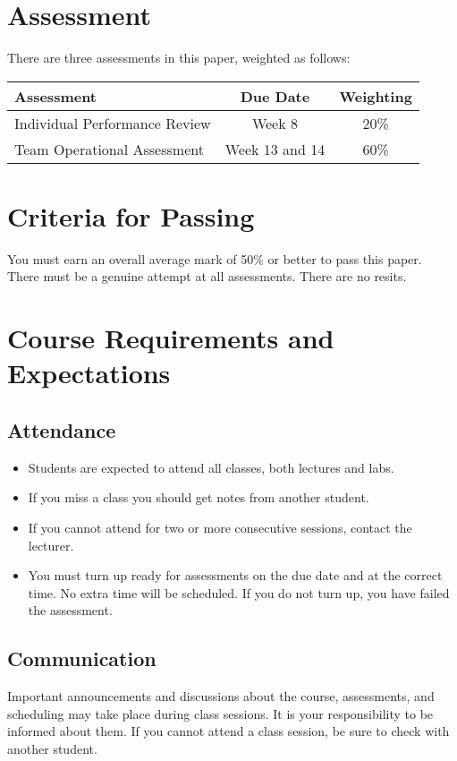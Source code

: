 \documentclass{article}
\begin{document}
\section*{Assessment}
There are three assessments in this paper, weighted as follows:


\begin{tabular}{|l|c|c|}
\hline
Assessment & Due Date & Weighting \\ \hline
Individual Performance Review & Week 8 & 20\% \\ \hline
Team Operational Assessment & Week 13 and 14 & 60\% \\ \hline
\end{tabular}


\section*{Criteria for Passing}
You must earn an overall average mark of 50\% or better to pass this paper. There must be a genuine attempt at all assessments. There are no resits.

\section*{Course Requirements and Expectations}
\subsection*{Attendance}
\begin{itemize}
 \item Students are expected to attend all classes, both lectures and labs.
 \item If you miss a class you should get notes from another student.
 \item If you cannot attend for two or more consecutive sessions, contact the lecturer.
 \item You must turn up ready for assessments on the due date and at the correct time. No 
       extra time will be scheduled. If you do not turn up, you have failed the assessment.
\end{itemize}

\subsection*{Communication}
Important announcements and discussions about the course, assessments, and scheduling may take place during class sessions.  It is your responsibility to be informed about them.  If you cannot attend a class session, be sure to check with another student.
\end{document}
